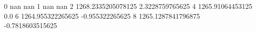 0 nan nan
1 nan nan
2 1268.2335205078125 2.3228759765625
4 1265.91064453125 0.0
6 1264.955322265625 -0.955322265625
8 1265.1287841796875 -0.7818603515625
